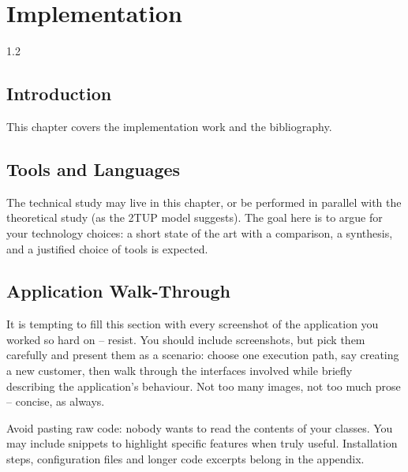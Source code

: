 \setcounter{chapter}{2}
\chapter{Implementation}
\minitoc
\graphicspath{{Chapter3/figures/}}

\pagestyle{fancy}
\fancyhf{}
\fancyhead[R]{\bfseries\rightmark}
\fancyfoot[R]{\thepage}
\renewcommand{\headrulewidth}{0.5pt}
\renewcommand{\footrulewidth}{0pt}
\renewcommand{\chaptermark}[1]{\markboth{{\chaptername~\thechapter.\ #1}}{}}
\renewcommand{\sectionmark}[1]{\markright{\thechapter.\thesection~ #1}}

\begin{spacing}{1.2}
\section*{Introduction}
This chapter covers the implementation work and the bibliography.

\section{Tools and Languages}
The technical study may live in this chapter, or be performed in parallel with
the theoretical study (as the 2TUP model suggests). The goal here is to argue
for your technology choices: a short state of the art with a comparison, a
synthesis, and a justified choice of tools is expected.

\section{Application Walk-Through}
It is tempting to fill this section with every screenshot of the application
you worked so hard on -- resist. You should include screenshots, but pick
them carefully and present them as a scenario: choose one execution path,
say creating a new customer, then walk through the interfaces involved while
briefly describing the application's behaviour. Not too many images, not too
much prose -- concise, as always.

Avoid pasting raw code: nobody wants to read the contents of your classes.
You may include snippets to highlight specific features
\cite{YOUSFI2015,Latex} when truly useful. Installation steps, configuration
files and longer code excerpts belong in the appendix.


\end{spacing}

